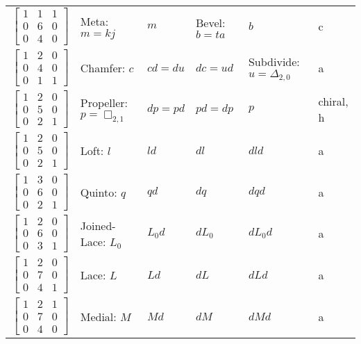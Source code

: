 \documentclass{amsart}[12pt]
\begin{document}
\begin{longtable}{c|p{2cm}|p{2cm}|p{2cm}|p{2cm}|p{3cm}}
    $\begin{bmatrix}
    1 & 1 & 1 \\
    0 & 6 & 0 \\
    0 & 4 & 0 \end{bmatrix}$& Meta: $m=kj$ & $m$ & Bevel: $b=ta$ & $b$ & c
    \\
    $\begin{bmatrix}
    1 & 2 & 0 \\
    0 & 4 & 0 \\
    0 & 1 & 1 \end{bmatrix}$& Chamfer: $c$ & $cd=du$ & $dc=ud$ & Subdivide: $u =\Delta_{2,0}$ & a
    \\
    $\begin{bmatrix}
    1 & 2 & 0 \\
    0 & 5 & 0 \\
    0 & 2 & 1 \end{bmatrix}$& Propeller: $p=\Box_{2,1}$ & $dp=pd$ & $pd=dp$ & $p$ & chiral, h
    \\
    $\begin{bmatrix}
    1 & 2 & 0 \\
    0 & 5 & 0 \\
    0 & 2 & 1 \end{bmatrix}$& Loft: $l$ & $ld$ & $dl$ & $dld$ & a
    \\
    $\begin{bmatrix}
    1 & 3 & 0 \\
    0 & 6 & 0 \\
    0 & 2 & 1 \end{bmatrix}$& Quinto: $q$ & $qd$ & $dq$ & $dqd$ & a
    \\
    $\begin{bmatrix}
    1 & 2 & 0 \\
    0 & 6 & 0 \\
    0 & 3 & 1 \end{bmatrix}$& Joined-Lace: $L_0$ & $L_0d$ & $dL_0$ & $dL_0d$
    & a
    \\
    $\begin{bmatrix}
    1 & 2 & 0 \\
    0 & 7 & 0 \\
    0 & 4 & 1 \end{bmatrix}$& Lace: $L$ & $Ld$ & $dL$ & $dLd$ & a
    \\
    $\begin{bmatrix}
    1 & 2 & 1 \\
    0 & 7 & 0 \\
    0 & 4 & 0 \end{bmatrix}$& Medial: $M$ & $Md$ & $dM$ & $dM d$ & a

\end{longtable}
\end{document}
